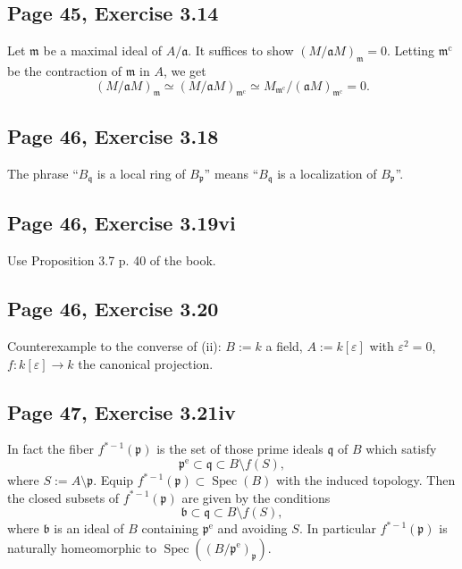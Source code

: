 \documentclass[parskip=half,fontsize=12pt]{scrartcl}%
\newcommand{\oo}{\operatorname}\newcommand{\ooo}{\operatorname*}
\newcommand{\mf}{\mathfrak}
\newcommand{\bbb}{\mf b}
\newcommand{\mmm}{\mf m}
\newcommand{\ppp}{\mf p}
\newcommand{\qqq}{\mf q}
\newcommand{\Spec}{\operatorname{Spec}}\newcommand{\Sp}{\operatorname{Spec}}
\begin{document}
\subsection{Page 45, Exercise 3.14}%

Let $\mf m$ be a maximal ideal of $A/\mf a$. It suffices to show $(M/\mf aM)_\mmm=0$. Letting $\mf m^{\oo c}$ be the contraction of $\mf m$ in $A$, we get 
$$
(M/\mf aM)_\mmm\simeq(M/\mf aM)_{\mf m^{\oo c}}\simeq M_{\mf m^{\oo c}}/(\mf aM)_{\mf m^{\oo c}}=0.
$$ 

\subsection{Page 46, Exercise 3.18}%

The phrase ``$B_\qqq$ is a local ring of $B_\ppp$'' means ``$B_\qqq$ is a localization of $B_\ppp$''.

\subsection{Page 46, Exercise 3.19vi}%

Use Proposition 3.7 p. 40 of the book.

\subsection{Page 46, Exercise 3.20}%

Counterexample to the converse of (ii): $B:=k$ a field, $A:=k[\varepsilon]$ with $\varepsilon^2=0$, $f:k[\varepsilon]\to k$ the canonical projection. 

\subsection{Page 47, Exercise 3.21iv}\label{321iv}%

In fact the fiber $f^{*-1}(\ppp)$ is the set of those prime ideals $\qqq$ of $B$ which satisfy 
$$
\ppp^{\oo{e}}\subset\qqq\subset B\setminus f(S),
$$ 
where $S:=A\setminus\ppp$. Equip $f^{*-1}(\ppp)\subset\Spec(B)$ with the induced topology. Then the closed subsets of $f^{*-1}(\ppp)$ are given by the conditions 
$$
\bbb\subset\qqq\subset B\setminus f(S),
$$ 
where $\bbb$ is an ideal of $B$ containing $\ppp^{\oo{e}}$ and avoiding $S$. In particular $f^{*-1}(\ppp)$ is naturally homeomorphic to $\Spec((B/\ppp^{\oo{e}})_\ppp)$.
\end{document}
